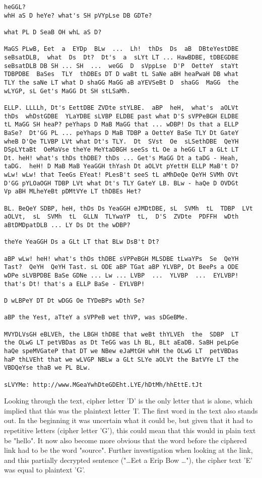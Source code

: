 \begin{lstlisting}[caption={Partially decrypted text}, label={lst:partial_decryption}] 
heGGL?
whH aS D heYe? what's SH pVYpLse DB GDTe?

what PL D SeaB OH whL aS D?

MaGS PLwB, Eet  a  EYDp  BLw  ...  Lh!  thDs  Ds  aB  DBteYestDBE
seBsatDLB,  what  Ds  Dt?  Dt's  a  sLYt LT ... HawBDBE, tDBEGDBE
seBsatDLB DB SH ... SH  ...  weGG  D  sVppLse  D'P  OetteY  staYt
TDBPDBE  BaSes  TLY  thDBEs DT D waBt tL SaNe aBH heaPwaH DB what
TLY the saNe LT what D shaGG MaGG aB aYEVSeBt D  shaGG  MaGG  the
wLYGP, sL Get's MaGG Dt SH stLSaMh.

ELLP. LLLLh, Dt's EettDBE ZVDte stYLBE.  aBP  heH,  what's  aOLVt
thDs  whDstGDBE  YLaYDBE sLVBP ELDBE past what D'S sVPPeBGH ELDBE
tL MaGG SH heaP? peYhaps D MaB MaGG that ... wDBP! Ds that a ELLP
BaSe?  Dt'GG PL ... peYhaps D MaB TDBP a OetteY BaSe TLY Dt GateY
wheB D'Qe TLVBP LVt what Dt's TLY.  Dt  SVst  Oe  sLSethDBE  QeYH
DSpLYtaBt  OeMaVse theYe MeYtaDBGH seeSs tL Oe a heGG LT a GLt LT
Dt. heH! what's thDs thDBE? thDs ... Get's MaGG Dt a taDG - Heah,
taDG.  heH! D MaB MaB YeaGGH thYash Dt aOLVt pYettH ELLP MaB't D?
wLw! wLw! that TeeGs EYeat! PLesB't seeS tL aMhDeQe QeYH SVMh OVt
D'GG pYLOaOGH TDBP LVt what Dt's TLY GateY LB. BLw - haQe D OVDGt
Vp aBH MLheYeBt pDMtVYe LT thDBEs Het?

BL. BeQeY SDBP, heH, thDs Ds YeaGGH eJMDtDBE, sL  SVMh  tL  TDBP  LVt
aOLVt,  sL  SVMh  tL  GLLN  TLYwaYP  tL,  D'S  ZVDte  PDFFH  wDth
aBtDMDpatDLB ... LY Ds Dt the wDBP?

theYe YeaGGH Ds a GLt LT that BLw DsB't Dt?

aBP wLw! heH! what's thDs thDBE sVPPeBGH MLSDBE tLwaYPs  Se  QeYH
Tast?  QeYH  QeYH Tast. sL ODE aBP TGat aBP YLVBP, Dt BeePs a ODE
wDPe sLVBPDBE BaSe GDNe ... Lw ... LVBP  ...  YLVBP  ...  EYLVBP!
that's Dt! that's a ELLP BaSe - EYLVBP!

D wLBPeY DT Dt wDGG Oe TYDeBPs wDth Se?

aBP the Yest, aTteY a sVPPeB wet thVP, was sDGeBMe.

MVYDLVsGH eBLVEh, the LBGH thDBE that weBt thYLVEh  the  SDBP  LT
the OLwG LT petVBDas as Dt TeGG was Lh BL, BLt aEaDB. SaBH peLpGe
haQe speMVGateP that DT we NBew eJaMtGH whH the OLwG LT  petVBDas
haP thLVEht that we wLVGP NBLw a GLt SLYe aOLVt the BatVYe LT the
VBDQeYse thaB we PL BLw.

sLVYMe: http://www.MGeaYwhDteGDEht.LYE/hDtMh/hhEttE.tJt
\end{lstlisting}
Looking through the text, cipher letter 'D' is the only letter that is alone, which implied that this was the plaintext letter 'I'.
The first word in the text also stands out. 
In the beginning it was uncertain what it could be, but given that it had to repetitive letters (cipher letter 'G'), this could mean that this would in plain text be "hello".
It now also become more obvious that the word before the ciphered link had to be the word "source".
Further investigation when looking at the link, and this partially decrypted sentence ("\ldots Eet  a  Erip  Bow \ldots"), the cipher text 'E' was equal to plaintext 'G'.

